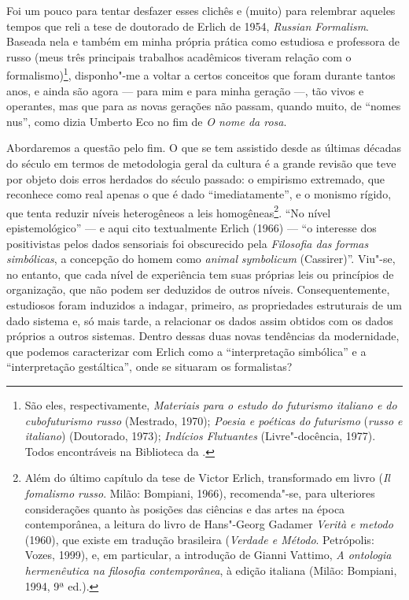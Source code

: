 {Foi um pouco para tentar desfazer esses clichês e (muito) para relembrar aqueles tempos
que reli a tese de doutorado de Erlich de 1954, \emph{Russian
Formalism}. Baseada nela e também em minha própria prática como
estudiosa e professora de russo (meus três principais trabalhos
acadêmicos tiveram relação com o formalismo)\footnote{São eles,
  respectivamente, \emph{Materiais para o estudo do futurismo italiano e
  do cubofuturismo russo} (Mestrado, 1970); \emph{Poesia e poéticas do
  futurismo} (\emph{russo e italiano}) (Doutorado, 1973); \emph{Indícios
  Flutuantes} (Livre"-docência, 1977). Todos encontráveis na Biblioteca
  da .}, disponho"-me a voltar a certos conceitos que foram durante
tantos anos, e ainda são agora --- para mim e para minha geração ---, tão
vivos e operantes, mas que para as novas gerações não passam, quando
muito, de ``nomes nus'', como dizia Umberto Eco no fim de \emph{O nome
da rosa}.



Abordaremos a questão pelo fim. O que se tem assistido desde as últimas
décadas do século  em termos de metodologia geral da cultura é a
grande revisão que teve por objeto dois erros herdados do século
passado: o empirismo extremado, que reconhece como real apenas o que é
dado ``imediatamente'', e o monismo rígido, que tenta reduzir níveis
heterogêneos a leis homogêneas\footnote{Além do último capítulo da
  tese de Victor Erlich, transformado em livro (\emph{Il fomalismo
  russo}. Milão: Bompiani, 1966), recomenda"-se, para ulteriores
  considerações quanto às posições das ciências e das
  artes na época contemporânea, a leitura do livro de Hans"-Georg Gadamer
  \emph{Verità e metodo} (1960), que existe em tradução brasileira
  (\emph{Verdade e Método}. Petrópolis: Vozes, 1999), e, em particular, a introdução
  de Gianni Vattimo, \emph{A ontologia hermenêutica na filosofia contemporânea}, à edição italiana (Milão: Bompiani, 1994, 
9ª ed.).}. ``No nível epistemológico'' --- e aqui cito textualmente Erlich (1966) --- ``o interesse dos
positivistas pelos dados sensoriais foi obscurecido pela \emph{Filosofia
das formas simbólicas}, a concepção do homem como \emph{animal}
\emph{symbolicum} (Cassirer)''.
Viu"-se, no entanto, que cada nível de experiência tem suas próprias leis ou
princípios de organização, que não podem ser deduzidos de outros níveis.
Consequentemente, estudiosos foram induzidos a indagar, primeiro, as
propriedades estruturais de um dado sistema e, só mais tarde, a
relacionar os dados assim obtidos com os dados próprios a outros
sistemas. Dentro dessas duas novas tendências da modernidade, que
podemos caracterizar com Erlich como a ``interpretação simbólica'' e a
``interpretação gestáltica'', onde se situaram os formalistas?

}
